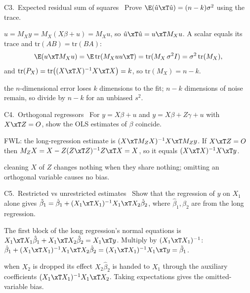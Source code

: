 \begin{qbox}{C3.\ Expected residual sum of squares}{\likely\ }
Prove $\E(\hat u\xT\hat u) = (n-k)\sigma^{2}$ using the trace.
\end{qbox}
\begin{solbox}
$\hat u=M_{X}y=M_{X}(X\beta+u)=M_{X}u$, so $\hat u\xT\hat u=u\xT M_{X}u$. A scalar equals its trace and
$\mathrm{tr}(AB)=\mathrm{tr}(BA)$:
\[
  \E(u\xT M_{X}u)=\E\,\mathrm{tr}(M_{X}uu\xT)=\mathrm{tr}(M_{X}\,\sigma^{2}I)=\sigma^{2}\,\mathrm{tr}(M_{X}),
\]
and $\mathrm{tr}(P_{X})=\mathrm{tr}\big((X\xT X)^{-1}X\xT X\big)=k$, so $\mathrm{tr}(M_{X})=n-k$.
\begin{why}\Why the $n$-dimensional error loses $k$ dimensions to the fit; $n-k$ dimensions of noise remain, so divide by
$n-k$ for an unbiased $s^{2}$.\end{why}
\end{solbox}

\begin{qbox}{C4.\ Orthogonal regressors}{\opt\ }
For $y = X\beta + u$ and $y = X\beta + Z\gamma + u$ with $X\xT Z = O$, show the OLS estimates of $\beta$ coincide.
\end{qbox}
\begin{solbox}
FWL: the long-regression estimate is $(X\xT M_{Z}X)^{-1}X\xT M_{Z}y$. If $X\xT Z=O$ then $M_{Z}X=X-Z(Z\xT Z)^{-1}Z\xT X=X$, so it
equals $(X\xT X)^{-1}X\xT y$.
\begin{why}\Why cleaning $X$ of $Z$ changes nothing when they share nothing; omitting an orthogonal variable causes no bias.\end{why}
\end{solbox}

\begin{qbox}{C5.\ Restricted vs unrestricted estimates}{\likely\ }
Show that the regression of $y$ on $X_{1}$ alone gives
$\tilde\beta_{1}=\hat\beta_{1}+(X_{1}\xT X_{1})^{-1}X_{1}\xT X_{2}\hat\beta_{2}$, where $\hat\beta_{1},\hat\beta_{2}$ are from the long regression.
\end{qbox}
\begin{solbox}
The first block of the long regression's normal equations is $X_{1}\xT X_{1}\hat\beta_{1}+X_{1}\xT X_{2}\hat\beta_{2}=X_{1}\xT y$. Multiply by
$(X_{1}\xT X_{1})^{-1}$:
$\hat\beta_{1}+(X_{1}\xT X_{1})^{-1}X_{1}\xT X_{2}\hat\beta_{2}=(X_{1}\xT X_{1})^{-1}X_{1}\xT y=\tilde\beta_{1}$.
\begin{why}\Why when $X_{2}$ is dropped its effect $X_{2}\hat\beta_{2}$ is handed to $X_{1}$ through the auxiliary coefficients
$(X_{1}\xT X_{1})^{-1}X_{1}\xT X_{2}$. Taking expectations gives the omitted-variable bias.\end{why}
\end{solbox}

